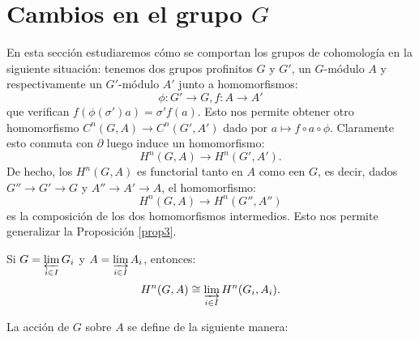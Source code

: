 \documentclass[a4paper,12pt, leqno]{article}
\begin{document}
\section{Cambios en el grupo $G$}
En esta sección estudiaremos cómo se comportan los grupos de cohomología en la siguiente situación: tenemos dos grupos profinitos $G$ y $G'$, un $G$-módulo $A$ y respectivamente un $G'$-módulo $A'$ junto a homomorfismos:
\begin{equation*}
\phi: G' \rightarrow G,f:A \rightarrow A'
\end{equation*}
que verifican $f(\phi(\sigma')a)=\sigma' f(a)$. Esto nos permite obtener otro homomorfismo $C^n(G,A)\rightarrow C^n(G',A')$ dado por $a \mapsto f \circ a \circ \phi$. Claramente esto conmuta con $\partial$ luego induce un homomorfismo:
\begin{equation*}
H^n(G,A) \rightarrow H^n(G',A').
\end{equation*}
De hecho, los $H^n(G,A)$ es functorial tanto en $A$ como een $G$, es decir, dados $G'' \rightarrow G' \rightarrow G$ y $A'' \rightarrow A' \rightarrow A$, el homomorfismo:
\begin{equation*}
H^n(G,A) \rightarrow H^n(G'',A'')
\end{equation*}	
es la composición de los dos homomorfismos intermedios. Esto nos permite generalizar la Proposición \ref{prop3}.
\begin{prop}
	Si $G=\varprojlim\limits_{i \in  I}G_i$ y $A=\varinjlim\limits_{i\in I}A_i$, entonces:
	\begin{equation*}
	H^n(G,A)\cong \varinjlim\limits_{i \in  I} H^n(G_i,A_i).
	\end{equation*}
\end{prop}
\begin{dem}
	La acción de $G$ sobre $A$ se define de la siguiente manera: 
\end{dem}
\end{document}
